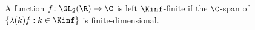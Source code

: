 A function $f\colon\GL_2(\R)\to\C$ is left $\Kinf$-finite if the $\C$-span of $\{\lambda(k)f:k\in\Kinf\}$ is finite-dimensional.
